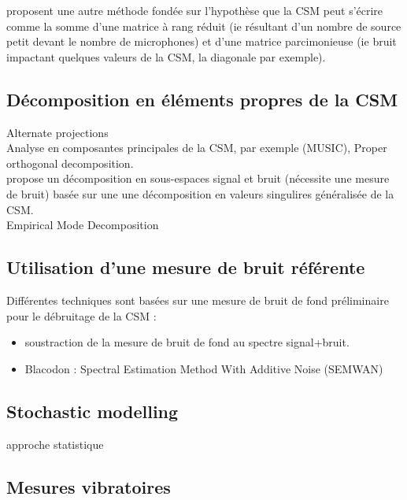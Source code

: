 \cite{finez:hal-01276687} proposent une autre méthode fondée sur l'hypothèse que la CSM peut s'écrire comme la somme d'une matrice à rang réduit (ie résultant d'un nombre de source petit devant le nombre de microphones) et d'une matrice parcimonieuse (ie bruit impactant quelques valeurs de la CSM, la diagonale par exemple).

\subsection{Décomposition en éléments propres de la CSM}
Alternate projections\\

Analyse en composantes principales de la CSM, par exemple (MUSIC), Proper orthogonal decomposition.\\
\cite{Bulte2007} propose un décomposition en sous-espaces signal et bruit (nécessite une mesure de bruit) basée sur une une décomposition en valeurs singulires généralisée de la CSM.\\
Empirical Mode Decomposition\\


\subsection{Utilisation d'une mesure de bruit référente}
Différentes techniques sont basées sur une mesure de bruit de fond préliminaire pour le débruitage de la CSM : 
\begin{itemize}
	\item soustraction de la mesure de bruit de fond au spectre signal+bruit.
	\item Blacodon : Spectral Estimation Method With Additive Noise (SEMWAN)
\end{itemize}









\subsection{Stochastic modelling}
approche statistique


\subsection{Mesures vibratoires}

